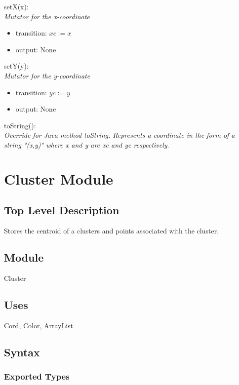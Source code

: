 \documentclass[12pt]{article}
\begin{document}
\noindent
setX(x):\\
\textit{Mutator for the x-coordinate}
\begin{itemize}
\item transition: $xc := x$
\item output: None
\end{itemize}

\noindent
setY(y):\\
\textit{Mutator for the y-coordinate}
\begin{itemize}
\item transition: $yc := y$
\item output: None
\end{itemize}

\noindent
toString():\\
\textit{Override for Java method toString. Represents a coordinate in the
form of a string "(x,y)" where x and y are xc and yc respectively}.

\newpage

\section*{Cluster Module}

\subsection* {Top Level Description}

Stores the centroid of a clusters and points associated with the cluster.

\subsection*{Module}

Cluster

\subsection* {Uses}

Cord, Color, ArrayList

\subsection* {Syntax}

\subsubsection* {Exported Types}
\end{document}
